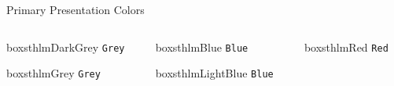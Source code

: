 \documentclass[newPxFont,numfooter,sectionpages]{beamer}
\begin{document}
\begin{frame}[c]{Primary Presentation Colors}

\begin{columns}[c]

\begin{column}{0.12\textwidth}
\vspace{3em}
\begin{beamercolorbox}[wd=\linewidth,ht=5ex,dp=3ex]{boxsthlmDarkGrey}
\centering
	\texttt{Grey}
\end{beamercolorbox}

\vspace{3em}

\begin{beamercolorbox}[wd=\linewidth,ht=5ex,dp=3ex]{boxsthlmGrey}
\centering
	\texttt{Grey}
\end{beamercolorbox}

\end{column}

\begin{column}{0.12\textwidth}

\vspace{3em}
	
\begin{beamercolorbox}[wd=\linewidth,ht=5ex,dp=3ex]{boxsthlmBlue}
\centering
	\texttt{Blue}
\end{beamercolorbox}

\vspace{3em}

\begin{beamercolorbox}[wd=\linewidth,ht=5ex,dp=3ex]{boxsthlmLightBlue}
\centering
	\texttt{Blue}
\end{beamercolorbox}
\end{column}

\begin{column}{0.12\textwidth}

\vspace{3em}
\begin{beamercolorbox}[wd=\linewidth,ht=5ex,dp=3ex]{boxsthlmRed}
\centering
	\texttt{Red}
\end{beamercolorbox}


\end{column}
\end{columns}
\end{frame}
\end{document}
